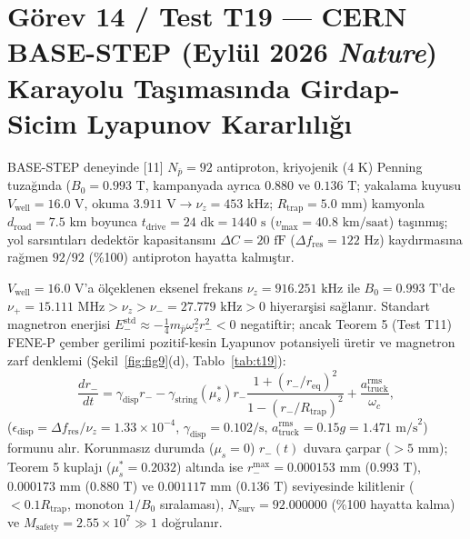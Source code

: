 \documentclass[12pt,a4paper]{article}
\begin{document}
\section{Görev 14 / Test T19 --- CERN BASE-STEP (Eylül 2026 \textit{Nature}) Karayolu Taşımasında Girdap-Sicim Lyapunov Kararlılığı}

BASE-STEP deneyinde [11] $N_{\bar{p}}=92$ antiproton, kriyojenik ($4\text{ K}$) Penning tuzağında ($B_0=0.993\text{ T}$, kampanyada ayrıca $0.880$ ve $0.136\text{ T}$; yakalama kuyusu $V_{\mathrm{well}}=16.0\text{ V}$, okuma $3.911\text{ V}\to\nu_z=453\text{ kHz}$; $R_{\mathrm{trap}}=5.0\text{ mm}$) kamyonla $d_{\mathrm{road}}=7.5\text{ km}$ boyunca $t_{\mathrm{drive}}=24\text{ dk}=1440\text{ s}$ ($v_{\max}=40.8\text{ km/saat}$) taşınmış; yol sarsıntıları dedektör kapasitansını $\Delta C=20\text{ fF}$ ($\Delta f_{\mathrm{res}}=122\text{ Hz}$) kaydırmasına rağmen $92/92$ (\%100) antiproton hayatta kalmıştır.

$V_{\mathrm{well}}=16.0\text{ V}$'a ölçeklenen eksenel frekans $\nu_z = 916.251\text{ kHz}$ ile $B_0=0.993\text{ T}$'de $\nu_+ = 15.111\text{ MHz} > \nu_z > \nu_- = 27.779\text{ kHz} > 0$ hiyerarşisi sağlanır. Standart magnetron enerjisi $E_-^{\mathrm{std}} \approx -\frac14 m_{\bar{p}}\omega_z^2 r_-^2 < 0$ negatiftir; ancak Teorem 5 (Test T11) FENE-P çember gerilimi pozitif-kesin Lyapunov potansiyeli üretir ve magnetron zarf denklemi (Şekil~\ref{fig:fig9}(d), Tablo~\ref{tab:t19}):
\begin{equation}
\frac{dr_-}{dt} = \gamma_{\mathrm{disp}} r_- - \gamma_{\mathrm{string}}(\mu_s^*) r_- \frac{1+(r_-/r_{\mathrm{eq}})^2}{1-(r_-/R_{\mathrm{trap}})^2} + \frac{a_{\mathrm{truck}}^{\mathrm{rms}}}{\omega_c},
\label{eq:basestep}
\end{equation}
($\epsilon_{\mathrm{disp}}=\Delta f_{\mathrm{res}}/\nu_z=1.33\times10^{-4}$, $\gamma_{\mathrm{disp}}=0.102\text{/s}$, $a_{\mathrm{truck}}^{\mathrm{rms}}=0.15g=1.471\text{ m/s}^2$) formunu alır. Korunmasız durumda ($\mu_s=0$) $r_-(t)$ duvara çarpar ($>5\text{ mm}$); Teorem 5 kuplajı ($\mu_s^*=0.2032$) altında ise $r_-^{\max} = 0.000153\text{ mm}$ ($0.993\text{ T}$), $0.000173\text{ mm}$ ($0.880\text{ T}$) ve $0.001117\text{ mm}$ ($0.136\text{ T}$) seviyesinde kilitlenir ($<0.1 R_{\mathrm{trap}}$, monoton $1/B_0$ sıralaması), $N_{\mathrm{surv}}=92.000000$ (\%100 hayatta kalma) ve $M_{\mathrm{safety}} = 2.55\times 10^7 \gg 1$ doğrulanır.
\end{document}
